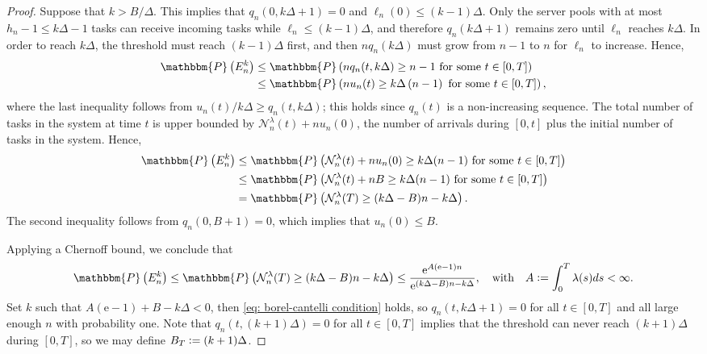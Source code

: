 \documentclass[a4paper, 12pt]{article}
\theoremstyle{definition}
\newcommand{\defeq}{\vcentcolon=}
\newcommand{\prob}{\mathbbm{P}}
\newcommand{\calN}{\mathcal{N}}
\newcommand{\e}{\mathrm{e}}
\begin{document}
\begin{proof}
Suppose that $k > B / \Delta$. This implies that $q_n(0, k\Delta + 1) = 0$ and $\ell_n(0) \leq (k - 1) \Delta$. Only the server pools with at most $h_n - 1 \leq k\Delta - 1$ tasks can receive incoming tasks while $\ell_n \leq (k - 1)\Delta$, and therefore $q_n(k\Delta + 1)$ remains zero until $\ell_n$ reaches $k\Delta$. In order to reach $k\Delta$, the threshold must reach $(k - 1)\Delta$ first, and then $nq_n(k\Delta)$ must grow from $n - 1$ to $n$ for $\ell_n$ to increase. Hence,
\begin{align*}
	\prob\left(E_n^k\right) &\leq \prob\left(nq_n(t, k\Delta) \geq n - 1 \ \text{for some} \ t \in [0, T]\right) \\
	&\leq \prob\left(nu_n(t) \geq k\Delta \left(n - 1\right) \ \text{for some} \ t \in [0, T]\right),
\end{align*}
where the last inequality follows from $u_n(t) / k\Delta \geq q_n(t, k\Delta)$; this holds since $q_n(t)$ is a non-increasing sequence. The total number of tasks in the system at time $t$ is upper bounded by $\calN_n^\lambda(t) + nu_n(0)$, the number of arrivals during $[0, t]$ plus the initial number of tasks in the system. Hence,
\begin{align*}
	\prob\left(E_n^k\right) &\leq \prob \left(\calN_n^\lambda(t) + nu_n(0) \geq k\Delta (n - 1) \ \text{for some} \ t \in [0, T]\right) \\
	&\leq \prob \left(\calN_n^\lambda(t) + n B \geq k\Delta (n - 1) \ \text{for some} \ t \in [0, T]\right) \\
	&= \prob \left(\calN_n^\lambda(T) \geq (k\Delta - B) n - k\Delta \right).
\end{align*}
The second inequality follows from $q_n(0, B + 1) = 0$, which implies that $u_n(0) \leq B$.

Applying a Chernoff bound, we conclude that
\begin{align*}
	\prob\left(E_n^k\right) \leq \prob\left(\calN_n^\lambda(T) \geq (k\Delta - B) n - k\Delta \right) \leq \frac{\e^{A\left(\e - 1\right)n}}{\e^{(k\Delta - B)n - k\Delta}}, \quad \text{with} \quad A \defeq \int_0^T \lambda(s)ds < \infty.
\end{align*}
Set $k$ such that $A\left(\e - 1\right) + B - k \Delta < 0$, then \eqref{eq: borel-cantelli condition} holds, so $q_n(t, k \Delta + 1) = 0$ for all $t \in [0, T]$ and all large enough $n$ with probability one. Note that $q_n(t, (k + 1)\Delta) = 0$ for all $t \in [0, T]$ implies that the threshold can never reach $(k + 1)\Delta$ during $[0, T]$, so we may define $B_T \defeq (k + 1)\Delta$.
%
\end{proof}
\end{document}
